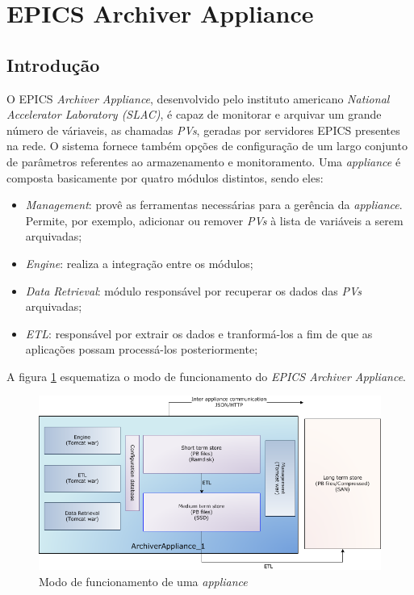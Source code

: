 \section {EPICS Archiver Appliance}
\label{sec:archiver}
\subsection {Introdução}

O EPICS \textit{Archiver Appliance}, desenvolvido pelo instituto americano
\textit{National Accelerator Laboratory (SLAC)}, é capaz de monitorar e arquivar
um grande número de váriaveis, as chamadas \textit{PVs}, geradas por servidores
EPICS presentes na rede. O sistema fornece também opções de configuração de um
largo conjunto de parâmetros referentes ao armazenamento e monitoramento. Uma
\textit{appliance} é composta basicamente por quatro módulos distintos, sendo eles:

\begin{itemize}
  \renewcommand\labelitemi{--}
  \item \textit{Management}: provê as ferramentas necessárias para a gerência
  da \textit{appliance}. Permite, por exemplo, adicionar ou remover \textit{PVs}
  à lista de variáveis a serem arquivadas;
  \item \textit{Engine}: realiza a integração entre os módulos;
  \item \textit{Data Retrieval}: módulo responsável por recuperar os dados das
  \textit{PVs} arquivadas;
  \item \textit{ETL}: responsável por extrair os dados e tranformá-los a fim de
  que as aplicações possam processá-los posteriormente;
\end{itemize}

A figura \ref{fig:epics_archiver} esquematiza o modo de funcionamento do
\textit{EPICS Archiver Appliance}.

\begin{figure}[h]
    
    \centering
    \includegraphics[scale=0.6]{image/applarch}
    \caption {Modo de funcionamento de uma \textit{appliance}}
    \label{fig:epics_archiver} 
\end{figure} 

